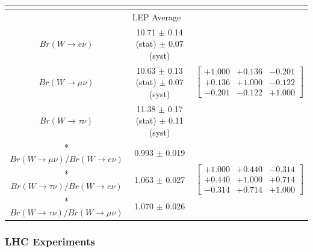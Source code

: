 \begin{table}[ht]
{\begin{tabular}{ |c| c  c | }
         \multicolumn{3}{c}{} \\
         \hline
         \multicolumn{3}{|c|}{LEP Average \cite{Schael:2013ita}} \\
         \hline
         $Br(W\to e    \nu)$    & 10.71 $\pm$ 0.14 (stat) $\pm$ 0.07 (syst) & 
         \multirow{3}{*}{
            \begin{footnotesize}
            $\begin{bmatrix}
                +1.000 &+0.136 &-0.201 \\ 
                +0.136 &+1.000 &-0.122 \\
                -0.201 &-0.122 &+1.000 
            \end{bmatrix}$ 
            \end{footnotesize} 
         } \\
         $Br(W\to \mu  \nu)$    & 10.63 $\pm$ 0.13 (stat) $\pm$ 0.07 (syst) & \\ 
         $Br(W\to \tau \nu)$    & 11.38 $\pm$ 0.17 (stat) $\pm$ 0.11 (syst) & \\
         \hline
         *$Br(W\to \mu  \nu)/ Br(W\to e \nu)$ & 0.993  $\pm$ 0.019 & 
         \multirow{3}{*}{
            \begin{footnotesize}
            $\begin{bmatrix}
                +1.000 &+0.440 &-0.314 \\ 
                +0.440 &+1.000 &+0.714 \\
                -0.314 &+0.714 &+1.000 
            \end{bmatrix}$ 
            \end{footnotesize} 
         } \\
         *$Br(W\to \tau \nu)/ Br(W\to e \nu)$ & 1.063  $\pm$ 0.027 & \\
         *$Br(W\to \tau \nu)/ Br(W\to\mu\nu)$ & 1.070  $\pm$ 0.026 &  \\
         
         \hline
    \end{tabular}}
    \label{tab:relatedWorks:lu:W:lep}
\end{table}


\subsubsection{LHC Experiments}

